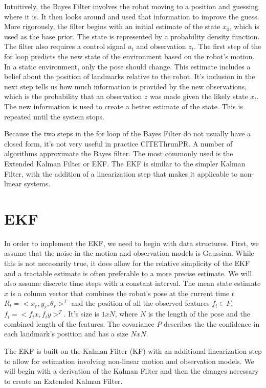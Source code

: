 \documentclass[12pt]{report}
\begin{document}
Intuitively, the Bayes Filter involves the robot moving to a position and guessing where it is.  It then looks around and used that information to improve the guess.  More rigorously, the filter begins with an initial estimate of the state $x_0$, which is used as the base prior.  The state is represented by a probability density function.  The filter also requires a control signal $u_t$ and observation $z_t$.  The first step of the for loop predicts the new state of the environment based on the robot's motion.  In a static environment, only the pose should change.  This estimate includes a belief about the position of landmarks relative to the robot.  It's inclusion in the next step tells us how much information is provided by the new observations, which is the probability that an observation $z$ was made given the likely state $x_t$.  The new information is used to create a better estimate of the state.  This is repeated until the system stops.  

Because the two steps in the for loop of the Bayes Filter do not usually have a closed form, it's not very useful in practice CITE{ThrunPR}.  A number of algorithms approximate the Bayes filter.  The most commonly used is the Extended Kalman Filter or EKF.  The EKF is similar to the simpler Kalman Filter, with the addition of a linearization step that makes it applicable to non-linear systems.  

\section{EKF}  
In order to implement the EKF, we need to begin with data structures.  First, we assume that the noise in the motion and observation models is Gaussian.  While this is not necessarily true, it does allow for the relative simplicity of the EKF and a tractable estimate is often preferable to a more precise estimate.  We will also assume discrete time steps with a constant interval.  The mean state estimate $x$ is a column vector that combines the robot's pose at the current time $t$ $R_t = <x_r, y_r, \theta_r>^T$ and the position of all the observed features $f_i \in F$, $f_i = <f_ix, f_iy>^T$.  It's size is $1xN$, where $N$ is the length of the pose and the combined length of the features.  The covariance $P$ describes the the confidence in each landmark's position and has a size $NxN$.

The EKF is built on the Kalman Filter (KF) with an additional linearization step to allow for estimation involving non-linear motion and observation models.  We will begin with a derivation of the Kalman Filter and then the changes necessary to create an Extended Kalman Filter.  
\end{document}

